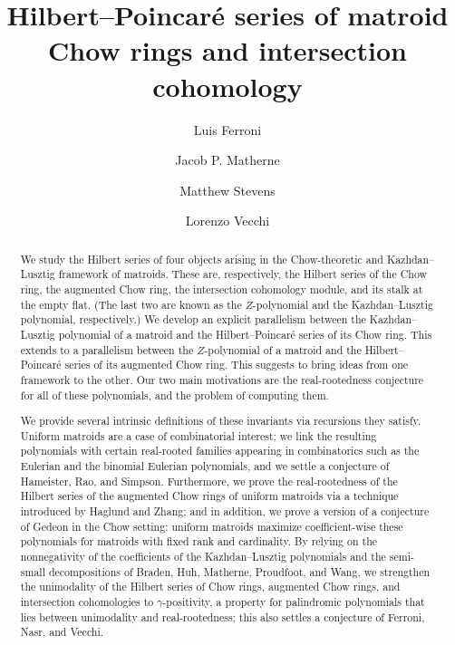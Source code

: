 \documentclass[11pt, a4paper, english]{amsart}
\title[Hilbert series of matroids]{Hilbert--Poincar\'e series of matroid\\ Chow rings and intersection cohomology}
\author[L. Ferroni]{Luis Ferroni}
\author[J. Matherne]{Jacob P. Matherne}
\author[M. Stevens]{Matthew Stevens}
\author[L. Vecchi]{Lorenzo Vecchi}
\theoremstyle{teoremas}
\theoremstyle{definition}
\begin{document}
\begin{abstract}
    We study the Hilbert series of four objects arising in the Chow-theoretic and Kazhdan--Lusztig framework of matroids. These are, respectively, the Hilbert series of the Chow ring, the augmented Chow ring, the intersection cohomology module, and its stalk at the empty flat. (The last two are known as the $Z$-polynomial and the Kazhdan--Lusztig polynomial, respectively.)
    We develop an explicit parallelism between the Kazhdan--Lusztig polynomial of a matroid and the Hilbert--Poincar\'e series of its Chow ring. This extends to a parallelism between the $Z$-polynomial of a matroid and the Hilbert--Poincar\'e series of its augmented Chow ring. This suggests to bring ideas from one framework to the other. Our two main motivations are the real-rootedness conjecture for all of these polynomials, and the problem of computing them.
    
    We provide several intrinsic definitions of these invariants via recursions they satisfy.
    Uniform matroids are a case of combinatorial interest; we link the resulting polynomials with certain real-rooted families appearing in combinatorics such as the Eulerian and the binomial Eulerian polynomials, and we settle a conjecture of Hameister, Rao, and Simpson.  Furthermore, we prove the real-rootedness of the Hilbert series of the augmented Chow rings of uniform matroids via a technique introduced by Haglund and Zhang; and in addition, we prove a version of a conjecture of Gedeon in the Chow setting: uniform matroids maximize coefficient-wise these polynomials for matroids with fixed rank and cardinality.
    By relying on the nonnegativity of the coefficients of the Kazhdan--Lusztig polynomials and the semi-small decompositions of Braden, Huh, Matherne, Proudfoot, and Wang, we strengthen the unimodality of the Hilbert series of Chow rings, augmented Chow rings, and intersection cohomologies to $\gamma$-positivity, a property for palindromic polynomials that lies between unimodality and real-rootedness; this also settles a conjecture of Ferroni, Nasr, and Vecchi. 
\end{abstract}

\maketitle

\end{document}
